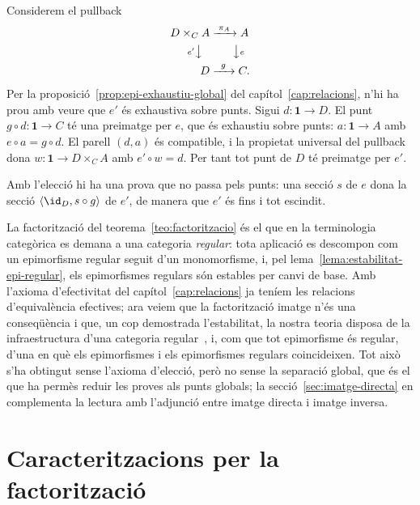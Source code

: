 \begin{prova}
Considerem el pullback
\[
\begin{aligned}
D\times_C A &\xrightarrow{\;\pi_A\;} A\\
{\scriptstyle e'}\big\downarrow\ \ &\qquad\big\downarrow{\scriptstyle e}\\
D &\xrightarrow{\;\;g\;\;} C.
\end{aligned}
\]
Per la proposició~\ref{prop:epi-exhaustiu-global} del
capítol~\ref{cap:relacions}, n'hi ha prou amb veure que \(e'\) és
exhaustiva sobre punts. Sigui \(d\colon\mathbf1\to D\). El punt
\(g\circ d\colon\mathbf1\to C\) té una preimatge per \(e\), que és
exhaustiu sobre punts: \(a\colon\mathbf1\to A\) amb \(e\circ a=g\circ d\).
El parell \((d,a)\) és compatible, i la propietat universal del pullback
dona \(w\colon\mathbf1\to D\times_CA\) amb \(e'\circ w=d\). Per tant tot
punt de \(D\) té preimatge per \(e'\).

Amb l'elecció hi ha una prova que no passa pels punts: una secció \(s\)
de \(e\) dona la secció \(\langle\id_D,s\circ g\rangle\) de \(e'\), de
manera que \(e'\) és fins i tot escindit.
\end{prova}

\begin{observacio}\label{obs:regularitat}
La factorització del teorema~\ref{teo:factoritzacio} és el que en la
terminologia categòrica es demana a una categoria \emph{regular}: tota
aplicació es descompon com un epimorfisme regular seguit d'un
monomorfisme, i, pel lema~\ref{lema:estabilitat-epi-regular}, els
epimorfismes regulars són estables per canvi de base. Amb l'axioma
d'efectivitat del capítol~\ref{cap:relacions} ja teníem les relacions
d'equivalència efectives; ara veiem que la factorització imatge n'és una
conseqüència i que, un cop demostrada l'estabilitat, la nostra teoria
disposa de la infraestructura d'una categoria regular~\cite{borceux-vol2},
i, com que tot epimorfisme és regular, d'una en què els epimorfismes i
els epimorfismes regulars coincideixen. Tot això s'ha obtingut sense
l'axioma d'elecció, però no sense la separació global, que és el que ha
permès reduir les proves als punts globals; la
secció~\ref{sec:imatge-directa} en complementa la lectura amb l'adjunció
entre imatge directa i imatge inversa.
\end{observacio}

\section{Caracteritzacions per la factorització}\label{sec:caracteritzacions}

